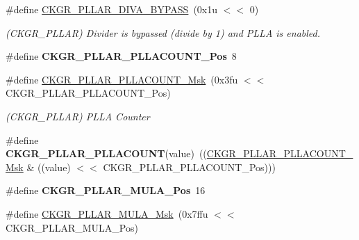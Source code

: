 \begin{DoxyCompactItemize}
\mbox{\label{group__SAMS70__PMC_ga20d7b7780216bc45bee25bec4438b4eb}} 
\#define \mbox{\hyperlink{group__SAMS70__PMC_ga20d7b7780216bc45bee25bec4438b4eb}{C\+K\+G\+R\+\_\+\+P\+L\+L\+A\+R\+\_\+\+D\+I\+V\+A\+\_\+\+B\+Y\+P\+A\+SS}}~(0x1u $<$$<$ 0)
\begin{DoxyCompactList}\small\item\em (C\+K\+G\+R\+\_\+\+P\+L\+L\+AR) Divider is bypassed (divide by 1) and P\+L\+LA is enabled. \end{DoxyCompactList}\item 
\mbox{\label{group__SAMS70__PMC_ga79c2a1a20693793a073171ca87cbca62}} 
\#define {\bfseries C\+K\+G\+R\+\_\+\+P\+L\+L\+A\+R\+\_\+\+P\+L\+L\+A\+C\+O\+U\+N\+T\+\_\+\+Pos}~8
\item 
\mbox{\label{group__SAMS70__PMC_ga1f07433c2360f33bb966516a27e485f1}} 
\#define \mbox{\hyperlink{group__SAMS70__PMC_ga1f07433c2360f33bb966516a27e485f1}{C\+K\+G\+R\+\_\+\+P\+L\+L\+A\+R\+\_\+\+P\+L\+L\+A\+C\+O\+U\+N\+T\+\_\+\+Msk}}~(0x3fu $<$$<$ C\+K\+G\+R\+\_\+\+P\+L\+L\+A\+R\+\_\+\+P\+L\+L\+A\+C\+O\+U\+N\+T\+\_\+\+Pos)
\begin{DoxyCompactList}\small\item\em (C\+K\+G\+R\+\_\+\+P\+L\+L\+AR) P\+L\+LA Counter \end{DoxyCompactList}\item 
\mbox{\label{group__SAMS70__PMC_ga3d075b69defd1b528e1530c80b57172b}} 
\#define {\bfseries C\+K\+G\+R\+\_\+\+P\+L\+L\+A\+R\+\_\+\+P\+L\+L\+A\+C\+O\+U\+NT}(value)~((\mbox{\hyperlink{group__SAMV71__PMC_ga1f07433c2360f33bb966516a27e485f1}{C\+K\+G\+R\+\_\+\+P\+L\+L\+A\+R\+\_\+\+P\+L\+L\+A\+C\+O\+U\+N\+T\+\_\+\+Msk}} \& ((value) $<$$<$ C\+K\+G\+R\+\_\+\+P\+L\+L\+A\+R\+\_\+\+P\+L\+L\+A\+C\+O\+U\+N\+T\+\_\+\+Pos)))
\item 
\mbox{\label{group__SAMS70__PMC_ga5435361dc5246da74e4019012ed9a474}} 
\#define {\bfseries C\+K\+G\+R\+\_\+\+P\+L\+L\+A\+R\+\_\+\+M\+U\+L\+A\+\_\+\+Pos}~16
\item 
\mbox{\label{group__SAMS70__PMC_gac720bcb52bfadc5d76f43d76acce85c7}} 
\#define \mbox{\hyperlink{group__SAMS70__PMC_gac720bcb52bfadc5d76f43d76acce85c7}{C\+K\+G\+R\+\_\+\+P\+L\+L\+A\+R\+\_\+\+M\+U\+L\+A\+\_\+\+Msk}}~(0x7ffu $<$$<$ C\+K\+G\+R\+\_\+\+P\+L\+L\+A\+R\+\_\+\+M\+U\+L\+A\+\_\+\+Pos)

\end{DoxyCompactItemize}
